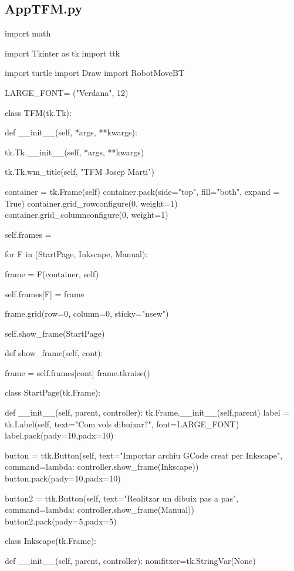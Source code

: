 \newpage

\subsection{AppTFM.py} \label{PyApp}
\begin{python}
	import math
	
	import Tkinter as tk
	import ttk
	
	import turtle
	import Draw
	import RobotMoveBT
	
	LARGE_FONT= ("Verdana", 12)
	
	
	class TFM(tk.Tk):
	
		def __init__(self, *args, **kwargs):
		
			tk.Tk.__init__(self, *args, **kwargs)
			
			tk.Tk.wm_title(self, "TFM Josep Marti")
			
			
			container = tk.Frame(self)
			container.pack(side="top", fill="both", expand = True)
			container.grid_rowconfigure(0, weight=1)
			container.grid_columnconfigure(0, weight=1)
			
			self.frames = {}
			
			for F in (StartPage, Inkscape, Manual):
			
				frame = F(container, self)
				
				self.frames[F] = frame
				
				frame.grid(row=0, column=0, sticky="nsew")
				
			self.show_frame(StartPage)
		
		def show_frame(self, cont):
		
			frame = self.frames[cont]
			frame.tkraise()
		
	
	class StartPage(tk.Frame):
	
		def __init__(self, parent, controller):
			tk.Frame.__init__(self,parent)
			label = tk.Label(self, text="Com vols dibuixar?", font=LARGE_FONT)
			label.pack(pady=10,padx=10)
			
			button = ttk.Button(self, text="Importar archiu GCode creat per Inkscape",
			command=lambda: controller.show_frame(Inkscape))
			button.pack(pady=10,padx=10)
			
			button2 = ttk.Button(self, text="Realitzar un dibuix pas a pas",
			command=lambda: controller.show_frame(Manual))
			button2.pack(pady=5,padx=5)
	
	
	
	
	class Inkscape(tk.Frame):
	
		def __init__(self, parent, controller):
		nomfitxer=tk.StringVar(None)
		

\end{python}
